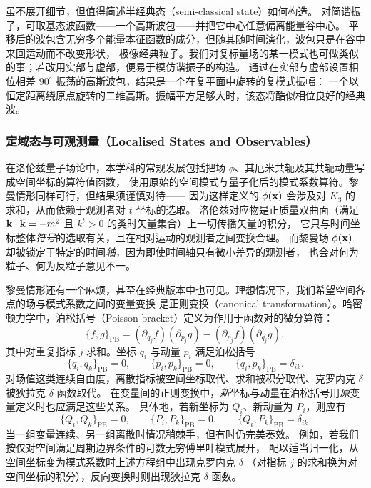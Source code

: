 虽不展开细节，但值得简述半经典态（semi-classical state）如何构造。
对简谐振子，可取基态波函数——一个高斯波包——并把它中心任意偏离能量谷中心。
平移后的波包含无穷多个能量本征函数的成分，但随其随时间演化，波包只是在谷中来回运动而不改变形状，
极像经典粒子。我们对复标量场的某一模式也可做类似的事；若改用实部与虚部，便易于模仿谐振子的构造。
通过在实部与虚部设置相位相差 $90^{\circ}$ 振荡的高斯波包，结果是一个在复平面中旋转的复模式振幅：
一个以恒定距离绕原点旋转的二维高斯。振幅平方足够大时，该态将酷似相位良好的经典波。

\subsubsection{定域态与可观测量（Localised States and Observables）}

在洛伦兹量子场论中，本学科的常规发展包括把场 $\phi$、其厄米共轭及其共轭动量写成空间坐标的算符值函数，
使用原始的空间模式与量子化后的模式系数算符。黎曼情形同样可行，但结果须谨慎对待——
因为这样定义的 $\phi(\mathbf{x})$ 会涉及对 $K_{3}$ 的求和，从而依赖于观测者对 $t$ 坐标的选取。
洛伦兹对应物是正质量双曲面（满足 $\mathbf{k}\cdot\mathbf{k}=-m^{2}$ 且 $k^{t}>0$ 的类时矢量集合）上一切传播矢量的积分，
它只与时间坐标整体\emph{符号}的选取有关，且在相对运动的观测者之间变换合理。
而黎曼场 $\phi(\mathbf{x})$ 却被锁定于特定的时间\emph{轴}，因为即使时间轴只有微小差异的观测者，
也会对何为粒子、何为反粒子意见不一。

黎曼情形还有一个麻烦，甚至在经典版本中也可见。理想情况下，我们希望空间各点的场与模式系数之间的变量变换
是正则变换（canonical transformation）。哈密顿力学中，泊松括号（Poisson bracket）定义为作用于函数对的微分算符：
\begin{equation*}
\{f,g\}_{\text{PB}}=(\partial_{q_{j}}f)(\partial_{p_{j}}g)-(\partial_{p_{j}}f)(\partial_{q_{j}}g),
\end{equation*}
其中对重复指标 $j$ 求和。坐标 $q_{i}$ 与动量 $p_{i}$ 满足泊松括号
\begin{equation*}
\{q_{i},q_{k}\}_{\text{PB}}=0,\qquad
\{p_{i},p_{k}\}_{\text{PB}}=0,\qquad
\{q_{i},p_{k}\}_{\text{PB}}=\delta_{ik}.
\end{equation*}
对场值这类连续自由度，离散指标被空间坐标取代、求和被积分取代、克罗内克 $\delta$ 被狄拉克 $\delta$ 函数取代。
在变量间的正则变换中，\emph{新}坐标与动量在泊松括号用\emph{原}变量定义时也应满足这些关系。
具体地，若新坐标为 $Q_{i}$、新动量为 $P_{i}$，则应有
\begin{equation*}
\{Q_{i},Q_{k}\}_{\text{PB}}=0,\qquad
\{P_{i},P_{k}\}_{\text{PB}}=0,\qquad
\{Q_{i},P_{k}\}_{\text{PB}}=\delta_{ik}.
\end{equation*}
当一组变量连续、另一组离散时情况稍棘手，但有时仍完美奏效。
例如，若我们按仅对空间满足周期边界条件的可数无穷傅里叶模式展开，
配以适当归一化，从空间坐标变为模式系数时上述方程组中出现克罗内克 $\delta$
（对指标 $j$ 的求和换为对空间坐标的积分），反向变换时则出现狄拉克 $\delta$ 函数。


